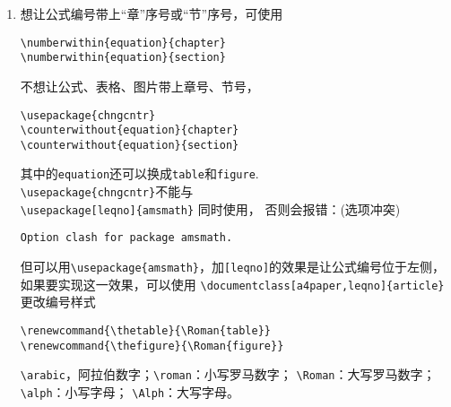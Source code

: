\documentclass{article}
\begin{document}
\begin{multicols}{2}
\begin{enumerate}
\begin{lstlisting}
\end{center}
\end{lstlisting} 
以上给公式外围加边框用的是：
\begin{lstlisting}
\begin{align*}
    \boxed{
        \begin{aligned}
            ······
        \end{aligned} 
    }
\end{align*}
\end{lstlisting}
或
\begin{lstlisting}
\usepackage{tcolorbox}
\tcbset{before={\noindent},
    after={\noindent},colback=white}
\begin{tcolorbox}
    \vspace{-5mm}
    \begin{align*}
        ······
    \end{align*} 
\end{tcolorbox}
\end{lstlisting} 

\item 想让公式编号带上“章”序号或“节”序号，可使用
\begin{lstlisting}
\numberwithin{equation}{chapter}
\numberwithin{equation}{section}    
\end{lstlisting} 
不想让公式、表格、图片带上章号、节号，
\begin{lstlisting}
\usepackage{chngcntr}
\counterwithout{equation}{chapter}
\counterwithout{equation}{section}  
\end{lstlisting} 
其中的\verb|equation|还可以换成\verb|table|和\verb|figure|.\\
\verb|\usepackage{chngcntr}|不能与 \\
\verb|\usepackage[leqno]{amsmath}| 同时使用，
否则会报错：(选项冲突) 
\begin{lstlisting}
Option clash for package amsmath.    
\end{lstlisting} 
但可以用\verb|\usepackage{amsmath}|，加\verb|[leqno]|的效果是让公式编号位于左侧，
如果要实现这一效果，可以使用
\verb|\documentclass[a4paper,leqno]{article}| \\
更改编号样式
\begin{lstlisting}
\renewcommand{\thetable}{\Roman{table}}
\renewcommand{\thefigure}{\Roman{figure}}    
\end{lstlisting} 
\verb|\arabic|，阿拉伯数字；\verb|\roman|：小写罗马数字；
\verb|\Roman|：大写罗马数字；\verb|\alph|：小写字母；
\verb|\Alph|：大写字母。


\end{enumerate}
\end{multicols}
\end{document}
